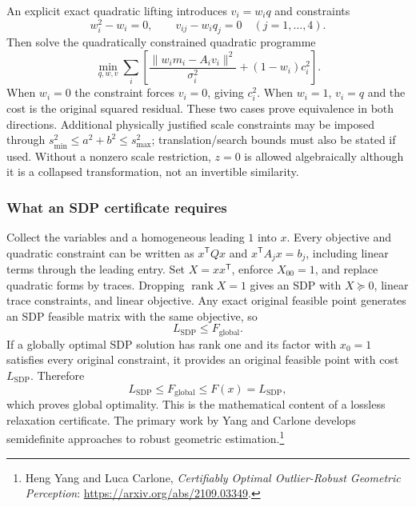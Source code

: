 An explicit exact quadratic lifting introduces $v_i=w_iq$ and constraints
\begin{equation}
 w_i^2-w_i=0,\qquad v_{ij}-w_iq_j=0\quad(j=1,\ldots,4).
\end{equation}
Then solve the quadratically constrained quadratic programme
\begin{equation}
 \min_{q,w,v}\sum_i\left[
  \frac{\|w_im_i-A_iv_i\|^2}{\sigma_i^2}+(1-w_i)c_i^2\right].
 \label{eq:lifted-TLS}
\end{equation}
When $w_i=0$ the constraint forces $v_i=0$, giving $c_i^2$.
When $w_i=1$, $v_i=q$ and the cost is the original squared residual.
These two cases prove equivalence in both directions. Additional
physically justified scale constraints may be imposed through
$s_{\min}^2\leq a^2+b^2\leq s_{\max}^2$; translation/search bounds
must also be stated if used. Without a nonzero scale restriction,
$z=0$ is allowed algebraically although it is a collapsed transformation,
not an invertible similarity.

\subsubsection{What an SDP certificate requires}

Collect the variables and a homogeneous leading $1$ into $x$.
Every objective and quadratic constraint can be written as
$x^{\mathsf T}Qx$ and $x^{\mathsf T}A_jx=b_j$, including linear terms
through the leading entry. Set $X=xx^{\mathsf T}$, enforce
$X_{00}=1$, and replace quadratic forms by traces. Dropping
$\operatorname{rank}X=1$ gives an SDP with $X\succeq0$, linear
trace constraints, and linear objective. Any exact original feasible
point generates an SDP feasible matrix with the same objective, so
\begin{equation}
 L_{\mathrm{SDP}}\leq F_{\mathrm{global}}.
\end{equation}
If a globally optimal SDP solution has rank one and its factor with
$x_0=1$ satisfies every original constraint, it provides an original
feasible point with cost $L_{\mathrm{SDP}}$. Therefore
\begin{equation}
 L_{\mathrm{SDP}}\leq F_{\mathrm{global}}\leq F(x)=L_{\mathrm{SDP}},
\end{equation}
which proves global optimality. This is the mathematical content of a
lossless relaxation certificate. The primary work by Yang and Carlone
develops semidefinite approaches to robust geometric estimation.\footnote{
Heng Yang and Luca Carlone, \emph{Certifiably Optimal Outlier-Robust
Geometric Perception}: \url{https://arxiv.org/abs/2109.03349}.}

